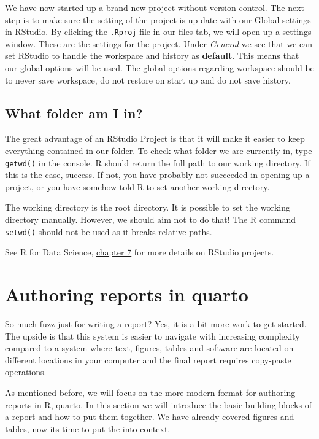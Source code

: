 \documentclass[
  11pt,
  letterpaper,
]{scrbook}
\begin{document}
We have now started up a brand new project without version control. The
next step is to make sure the setting of the project is up date with our
Global settings in RStudio. By clicking the \texttt{.Rproj} file in our
files tab, we will open up a settings window. These are the settings for
the project. Under \emph{General} we see that we can set RStudio to
handle the workspace and history as \textbf{default}. This means that
our global options will be used. The global options regarding workspace
should be to never save workspace, do not restore on start up and do not
save history.

\hypertarget{what-folder-am-i-in}{%
\subsection{What folder am I in?}\label{what-folder-am-i-in}}

The great advantage of an RStudio Project is that it will make it easier
to keep everything contained in our folder. To check what folder we are
currently in, type \texttt{getwd()} in the console. R should return the
full path to our working directory. If this is the case, success. If
not, you have probably not succeeded in opening up a project, or you
have somehow told R to set another working directory.

The working directory is the root directory. It is possible to set the
working directory manually. However, we should aim not to do that! The R
command \texttt{setwd()} should not be used as it breaks relative paths.

See R for Data Science,
\href{https://r4ds.hadley.nz/workflow-scripts}{chapter 7} for more
details on RStudio projects.

\hypertarget{authoring-reports-in-quarto}{%
\section{Authoring reports in
quarto}\label{authoring-reports-in-quarto}}

So much fuzz just for writing a report? Yes, it is a bit more work to
get started. The upside is that this system is easier to navigate with
increasing complexity compared to a system where text, figures, tables
and software are located on different locations in your computer and the
final report requires copy-paste operations.

As mentioned before, we will focus on the more modern format for
authoring reports in R, quarto. In this section we will introduce the
basic building blocks of a report and how to put them together. We have
already covered figures and tables, now its time to put the into
context.
\end{document}
